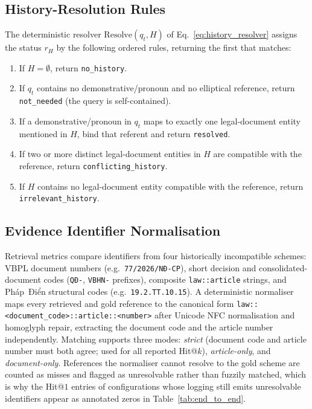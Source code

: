 \subsection{History-Resolution Rules}\label{app:resolver}

The deterministic resolver $\mathrm{Resolve}(q_t,H)$ of
Eq.~\eqref{eq:history_resolver} assigns the status $r_H$ by the following
ordered rules, returning the first that matches:
\begin{enumerate}
\item If $H=\emptyset$, return \texttt{no\_history}.
\item If $q_t$ contains no demonstrative/pronoun and no elliptical reference,
      return \texttt{not\_needed} (the query is self-contained).
\item If a demonstrative/pronoun in $q_t$ maps to exactly one legal-document
      entity mentioned in $H$, bind that referent and return \texttt{resolved}.
\item If two or more distinct legal-document entities in $H$ are compatible
      with the reference, return \texttt{conflicting\_history}.
\item If $H$ contains no legal-document entity compatible with the reference,
      return \texttt{irrelevant\_history}.
\end{enumerate}

\subsection{Evidence Identifier Normalisation}\label{app:idnorm}

Retrieval metrics compare identifiers from four historically incompatible
schemes: VBPL document numbers (e.g.\ \texttt{77/2026/NĐ-CP}), short decision
and consolidated-document codes (\texttt{QĐ-}, \texttt{VBHN-} prefixes),
composite \texttt{law::article} strings, and Pháp~Điển structural codes
(e.g.\ \texttt{19.2.TT.10.15}). A deterministic normaliser maps every
retrieved and gold reference to the canonical form
\texttt{law::<document\_code>::article::<number>} after Unicode NFC
normalisation and homoglyph repair, extracting the document code and the
article number independently. Matching supports three modes: \emph{strict}
(document code and article number must both agree; used for all reported
Hit@$k$), \emph{article-only}, and \emph{document-only}. References the
normaliser cannot resolve to the gold scheme are counted as misses and
flagged as unresolvable rather than fuzzily matched, which is why the
Hit@$1$ entries of configurations whose logging still emits unresolvable
identifiers appear as annotated zeros in Table~\ref{tab:end_to_end}.

